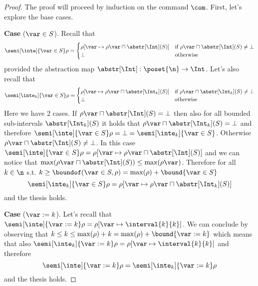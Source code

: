 \begin{proof}

  The proof will proceed by induction on the command \(\com\). First,
  let's explore the base cases.

  \medskip
  
  \noindent
  \textbf{Case} (\(\var \in S\)).
  Recall that
  \begin{equation*}
    \semi[\inte]{\var \in S}\rho = \begin{cases}
      \rho[\var \mapsto \rho\var \sqcap \abstr[\Int](S)] & \text{if } \rho\var \sqcap \abstr[\Int](S) \neq \bot \\
      \bot & \text{otherwise}
    \end{cases}
  \end{equation*}
  provided the abstraction map
  \({\abstr[\Int] : \poset{\n} \to \Int}\). Let's also recall that
  \begin{equation*}
    \semi[\inte_k]{\var \in S}\rho = \begin{cases}
      \rho[\var \mapsto \rho\var \sqcap \abstr[\Int_k](S)] & \text{if } \rho\var \sqcap \abstr[\Int_k](S) \neq \bot \\
      \bot & \text{otherwise}
    \end{cases}
  \end{equation*}
  Here we have 2 cases. If
  \({\rho\var \sqcap \abstr[\Int](S) = \bot}\) then also for all
  bounded sub-intervals \(\abstr[\Int_k](S)\) it holds that
  \({\rho\var \sqcap \abstr[\Int_k](S) = \bot}\) and therefore
  \({\semi[\inte]{\var\in S}\rho = \bot = \semi[\inte_k]{\var \in
      S}}\). Otherwise
  \({\rho\var \sqcap \abstr[\Int](S) \neq \bot}\). In this case
  \({\semi[\inte]{\var \in S}\rho = \rho[\var \mapsto \rho\var \sqcap
    \abstr[\Int](S)]}\) and we can notice that
  \(\max(\rho\var \sqcap \abstr[\Int](S)) \leq
  \max(\rho\var)\). Therefore for all \(k\in\n\) s.t.
  \({k\geq \boundof(\var \in S, \rho) = \max(\rho) + \bound{\var\in
      S}}\)
  \begin{equation*}
    \semi[\inte_k]{\var \in S}\rho = \rho[\var \mapsto \rho\var \sqcap \abstr[\Int_k](S)]
  \end{equation*}
  and the thesis holds.

  \medskip
  
  \noindent
  \textbf{Case} (\(\var := k\)).
  Let's recall that
  \({\semi[\inte]{\var := k}\rho = \rho[\var \mapsto \interval{k}{k}
    ]}\). We can conclude by observing that
  \({k \leq k \leq \max(\rho) + k = \max(\rho) + \bound{\var := k}}\)
  which means that also
  \({\semi[\inte_k]{\var := k}\rho = \rho[\var \mapsto
    \interval{k}{k}]}\) and therefore
  \begin{equation*}
    \semi[\inte]{\var := k}\rho = \semi[\inte_k]{\var := k}\rho
  \end{equation*}
  and the thesis holds.


\end{proof}

